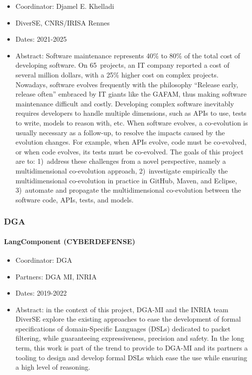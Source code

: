 \begin{participants}
\end{participants}

\begin{itemize}
	\item Coordinator: Djamel E. Khelladi
	\item DiverSE, CNRS/IRISA Rennes
	\item Dates: 2021-2025
	\item Abstract:
  Software maintenance represents 40\% to 80\% of the total cost of developing software. On 65~projects, an IT company reported a cost of several million dollars, with a 25\% higher cost on complex projects. Nowadays, software evolves frequently with the philosophy “Release early, release often” embraced by IT giants like the GAFAM, thus making software maintenance difficult and costly. Developing complex software inevitably requires developers to handle multiple dimensions, such as APIs to use, tests to write, models to reason with, etc. When software evolves, a co-evolution is usually necessary as a follow-up, to resolve the impacts caused by the evolution changes. For example, when APIs evolve, code must be co-evolved, or when code evolves, its tests must be co-evolved. The goals of this project are to: 1)~address these challenges from a novel perspective, namely a multidimensional co-evolution approach, 2)~investigate empirically the multidimensional co-evolution in practice in GitHub, Maven, and Eclipse, 3)~automate and propagate the multidimensional co-evolution between the software code, APIs, tests, and models.
\end{itemize}



\subsubsection{DGA}

\paragraph*{\label{project:fpml}LangComponent (CYBERDEFENSE)}

\begin{participants}
\end{participants}

   \begin{itemize}
   	    \item Coordinator: DGA
      	\item Partners: DGA MI, INRIA
      	\item Dates: 2019-2022
      	\item Abstract: in the context of this project, DGA-MI and the INRIA team DiverSE explore the existing approaches to ease the development of formal specifications of domain-Specific Languages (DSLs) dedicated to packet filtering, while guaranteeing expressiveness, precision and safety. In the long term, this work is part of the trend to provide to DGA-MI and its partners a tooling to design and develop formal DSLs which ease the use while ensuring a high level of reasoning.
      \end{itemize}


